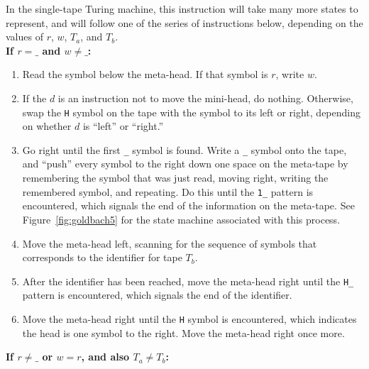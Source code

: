 In the single-tape Turing machine, this instruction will take many more states to represent, and will follow one of the series of instructions below, depending on the values of $r$, $w$, $T_a$, and $T_b$. \\

\textbf{If $r = \texttt{\_}$ and $w \not= \texttt{\_}$:}

\begin{enumerate}

\item Read the symbol below the meta-head. If that symbol is $r$, write $w$.
\item If the $d$ is an instruction not to move the mini-head, do nothing. Otherwise, swap the \texttt{H} symbol on the tape with the symbol to its left or right, depending on whether $d$ is ``left'' or ``right.''
\item Go right until the first \texttt{\_} symbol is found. Write a \texttt{\_} symbol onto the tape, and ``push'' every symbol to the right down one space on the meta-tape by remembering the symbol that was just read, moving right, writing the remembered symbol, and repeating. Do this until the \texttt{1\_} pattern is encountered, which signals the end of the information on the meta-tape. See Figure~\ref{fig:goldbach5} for the state machine associated with this process.
\item Move the meta-head left, scanning for the sequence of symbols that corresponds to the identifier for tape $T_b$.
\item After the identifier has been reached, move the meta-head right until the \texttt{H\_} pattern is encountered, which signals the end of the identifier.
\item Move the meta-head right until the \texttt{H} symbol is encountered, which indicates the head is one symbol to the right. Move the meta-head right once more.

\end{enumerate}

\textbf{If $r \not= \texttt{\_}$ or $w = r$, and also $T_a \not= T_b$:}

